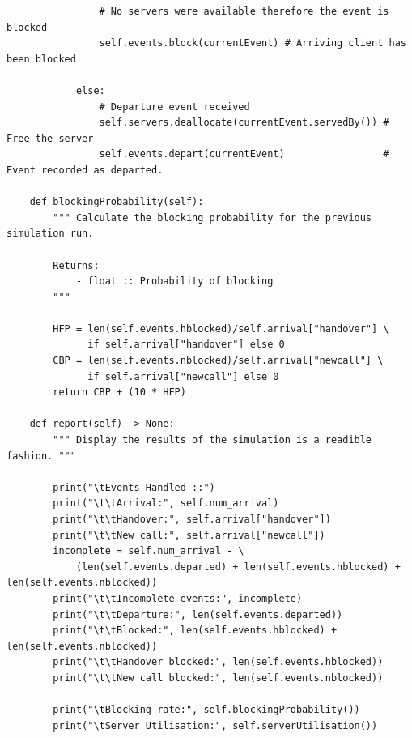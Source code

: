 \documentclass{ecmm427_assignment}
\begin{document}
\begin{verbatim}
                # No servers were available therefore the event is blocked
                self.events.block(currentEvent) # Arriving client has been blocked

            else:
                # Departure event received
                self.servers.deallocate(currentEvent.servedBy()) # Free the server
                self.events.depart(currentEvent)                 # Event recorded as departed.

    def blockingProbability(self):
        """ Calculate the blocking probability for the previous simulation run.
        
        Returns:
            - float :: Probability of blocking 
        """

        HFP = len(self.events.hblocked)/self.arrival["handover"] \
              if self.arrival["handover"] else 0
        CBP = len(self.events.nblocked)/self.arrival["newcall"] \
              if self.arrival["newcall"] else 0
        return CBP + (10 * HFP)

    def report(self) -> None:
        """ Display the results of the simulation is a readible fashion. """
        
        print("\tEvents Handled ::") 
        print("\t\tArrival:", self.num_arrival)
        print("\t\tHandover:", self.arrival["handover"])
        print("\t\tNew call:", self.arrival["newcall"])
        incomplete = self.num_arrival - \
            (len(self.events.departed) + len(self.events.hblocked) + len(self.events.nblocked))
        print("\t\tIncomplete events:", incomplete)
        print("\t\tDeparture:", len(self.events.departed))
        print("\t\tBlocked:", len(self.events.hblocked) + len(self.events.nblocked))
        print("\t\tHandover blocked:", len(self.events.hblocked))
        print("\t\tNew call blocked:", len(self.events.nblocked))

        print("\tBlocking rate:", self.blockingProbability())
        print("\tServer Utilisation:", self.serverUtilisation())  
\end{verbatim}
\end{document}
